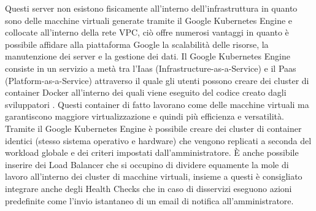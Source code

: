Questi server non esistono fisicamente all'interno dell'infrastruttura in quanto sono delle macchine virtuali generate tramite il Google Kubernetes Engine e collocate all'interno della rete VPC, ciò offre numerosi vantaggi in quanto è possibile affidare alla piattaforma Google la scalabilità delle risorse, la manutenzione dei server e la gestione dei dati. Il Google Kubernetes Engine consiste in un servizio a metà tra l'Iaas (Infrastructure-as-a-Service) e il Paas (Platform-as-a-Service) attraverso il quale gli utenti possono creare dei cluster di container Docker all'interno dei quali viene eseguito del codice creato dagli sviluppatori \cite{Kubernetes}. Questi container di fatto lavorano come delle macchine virtuali ma garantiscono maggiore virtualizzazione e quindi più efficienza e versatilità. Tramite il Google Kubernetes Engine è possibile creare dei cluster di container identici (stesso sistema operativo e hardware) che vengono replicati a seconda del workload globale e dei criteri impostati dall'amministratore. È anche possibile inserire dei Load Balancer che si occupino di dividere equamente la mole di lavoro all'interno dei cluster di macchine virtuali, insieme a questi è consigliato integrare anche degli Health Checks che in caso di disservizi eseguono azioni predefinite come l'invio istantaneo di un email di notifica all'amministratore. 
